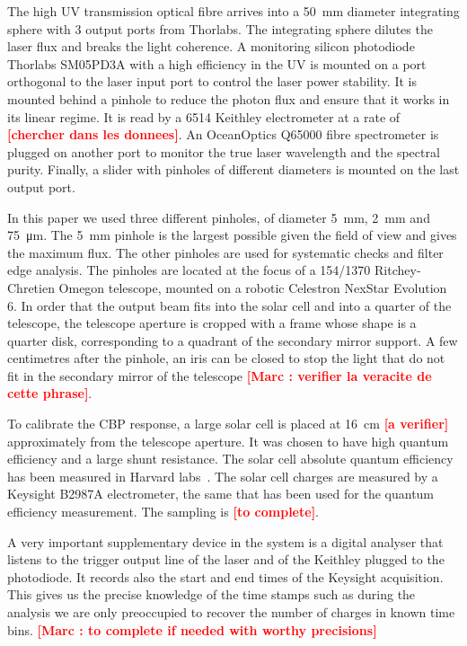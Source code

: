 \documentclass[printer]{aa}
\newcommand{\todo}[1]{\textbf{\textcolor{red}{[#1]}}\xspace}
\begin{document}
The high UV transmission optical fibre arrives into a \SI{50}{\mm} diameter integrating sphere with 3 output ports from Thorlabs. The integrating sphere dilutes the laser flux and breaks the light coherence. A monitoring silicon photodiode Thorlabs SM05PD3A with a high efficiency in the UV is mounted on a port orthogonal to the laser input port to control the laser power stability. It is mounted behind a pinhole to reduce the photon flux and ensure that it works in its linear regime. It is read by a 6514 Keithley electrometer at a rate of \todo{chercher dans les donnees}. An OceanOptics Q65000 fibre spectrometer is plugged on another port to monitor the true laser wavelength and the spectral purity. Finally, a slider with pinholes of different diameters is mounted on the last output port. 

In this paper we used three different pinholes, of diameter \SI{5}{\mm}, \SI{2}{\mm} and \SI{75}{\um}. The \SI{5}{\mm} pinhole is the largest possible given the \SD field of view and gives the maximum flux. The other pinholes are used for systematic checks and filter edge analysis. The pinholes are located at the focus of a 154/1370 Ritchey-Chretien Omegon telescope, mounted on a robotic Celestron NexStar Evolution 6. In order that the output beam fits into the solar cell and into a quarter of the \SD telescope, the telescope aperture is cropped with a frame whose shape is a quarter disk, corresponding to a quadrant of the secondary mirror support. A few centimetres after the pinhole, an iris can be closed to stop the light that do not fit in the secondary mirror of the telescope \todo{Marc : verifier la veracite de cette phrase}.

To calibrate the CBP response, a large solar cell is placed at \SI{16}{\cm} \todo{a verifier} approximately from the telescope aperture. It was chosen to have high quantum efficiency and a large shunt resistance. The solar cell absolute quantum efficiency has been measured in Harvard labs~\cite{solarcell}. The solar cell charges are measured by a Keysight B2987A electrometer, the same that has been used for the quantum efficiency measurement. The sampling is \todo{to complete}.

A very important supplementary device in the system is a digital analyser that listens to the trigger output line of the laser and of the Keithley plugged to the photodiode. It records also the start and end times of the Keysight acquisition. This gives us the precise knowledge of the time stamps such as during the analysis we are only preoccupied to recover the number of charges in known time bins. \todo{Marc : to complete if needed with worthy precisions}
\end{document}
